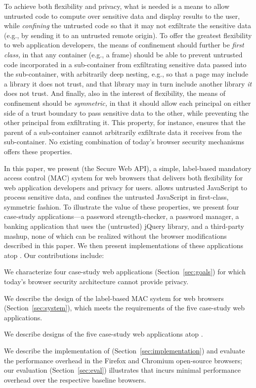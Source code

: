 To achieve both flexibility and privacy, what is needed is a means to
allow untrusted code to compute over sensitive data and display
results to the user, while \emph{confining} the untrusted code so that
it may not exfiltrate the sensitive data (e.g., by sending it to an untrusted remote
origin).
%
To offer the greatest flexibility to web application developers, the
means of confinement should further be \emph{first class,} in that any
container (e.g., a frame) should be able to prevent untrusted code
incorporated in a sub-container from exfiltrating sensitive data passed
into the sub-container, with arbitrarily deep nesting, e.g., so that a
page may include a library it does not trust, and that library may in
turn include another library \emph{it} does not trust.
%
And finally, also in the interest of flexibility, the means of
confinement should be \emph{symmetric,} in that it should allow each
principal on either side of a trust boundary to pass sensitive data to
the other, while preventing the other principal from exfiltrating it.  
%
This property, for instance, ensures that the parent of a
sub-container cannot arbitrarily exfiltrate data it receives from the
sub-container.
%
No existing combination of today's browser security mechanisms offers these
properties.

In this paper, we present \sys{} (the Secure Web API), a simple,
label-based mandatory access control (MAC) system for web browsers
that delivers both flexibility for web application developers and
privacy for users. \sys{} allows untrusted JavaScript to
process sensitive data, and confines the untrusted JavaScript in
first-class, symmetric fashion.  To illustrate the value of these
properties, we present four case-study applications---a password
strength-checker, a password manager, a banking application that uses
the (untrusted) jQuery library, and a third-party mashup, none of which can be realized
without the browser modifications described in this paper.  We then
present implementations of these applications atop \sys. Our
contributions include:

\begin{CompactItemize}
\item We characterize four case-study web applications
  (Section~\ref{sec:goals}) for which today's browser security
  architecture cannot provide privacy.
\item We describe the design of the \sys{} label-based MAC system
  for web browsers (Section~\ref{sec:system}), which meets the
  requirements of the five case-study web applications.
\item We describe designs of the five case-study web applications atop
  \sys.
\item We describe the implementation of \sys{}
  (Section~\ref{sec:implementation}) and evaluate the performance
  overhead in the Firefox and Chromium open-source browsers; our
  evaluation (Section~\ref{sec:eval}) illustrates that \sys{} incurs
  minimal performance overhead over the respective baseline browsers.
\end{CompactItemize}

